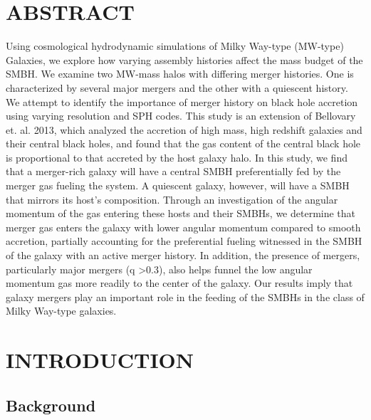 \documentclass[12pt,headA,chapB]{fiskthesis}
\newcommand{\cstyleA}
{
  \titleformat{\chapter}[display]
 {\bfseries\large\vspace{-3em}}
 {\chaptertitlename\hspace{2mm}\thechapter}
 {0pt}{}

 \titlespacing*{\chapter}{0pt}{0pt}{12pt}
}
\begin{document}
\newpage
{}
\listoffigures
\thispagestyle{fancy}


\newpage
{}
\chapter*{\normalsize ABSTRACT}
\thispagestyle{empty}
\rhead{\small\thepage}
Using cosmological hydrodynamic simulations of Milky Way-type (MW-type) Galaxies, we explore how varying assembly histories affect the mass budget of the SMBH. We examine two MW-mass halos with differing merger histories. One is characterized by several major mergers and the other with a quiescent history. We attempt to identify the importance of merger history on black hole accretion using varying resolution and SPH codes. This study is an extension of Bellovary et. al. 2013, which analyzed the accretion of high mass, high redshift galaxies and their central black holes, and found that the gas content of the central black hole is proportional to that accreted by the host galaxy halo. In this study, we find that a merger-rich galaxy will have a central SMBH preferentially fed by the merger gas fueling the system. A quiescent galaxy, however, will have a SMBH that mirrors its host's composition. Through an investigation of the angular momentum of the gas entering these hosts and their SMBHs, we determine that merger gas enters the galaxy with lower angular momentum compared to smooth accretion, partially accounting for the preferential fueling witnessed in the SMBH of the galaxy with an active merger history. In addition, the presence of mergers, particularly major mergers (q \textgreater 0.3), also helps funnel the low angular momentum gas more readily to the center of the galaxy. Our results imply that galaxy mergers play an important role in the feeding of the SMBHs in the class of Milky Way-type galaxies.
\vspace{4ex}


\mainmatter
\chapter{\normalsize INTRODUCTION}
\section{\normalsize Background}
\thispagestyle{empty}
\end{document}
